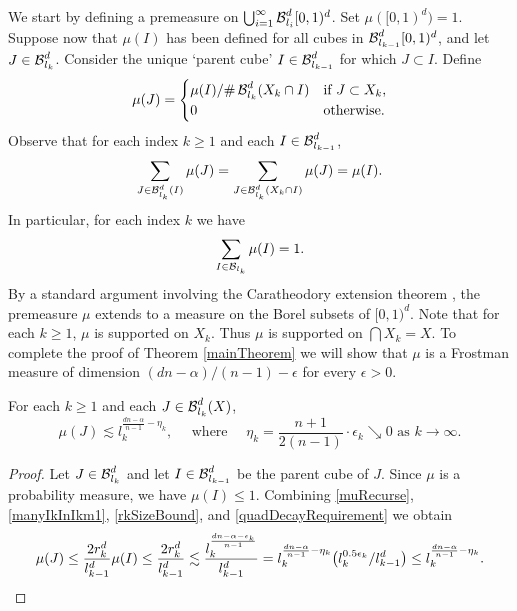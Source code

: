 We start by defining a premeasure on $\bigcup_{i = 1}^\infty \operatorname{\mathcal{B}}^d_{l_i}[0,1)^d$. Set $\mu([0,1)^d) = 1$. Suppose now that $\mu(I)$ has been defined for all cubes in $\operatorname{\mathcal{B}}^d_{l_{k-1}}[0,1)^d$, and let $J \in \operatorname{\mathcal{B}}^d_{l_k}$. Consider the unique `parent cube' $I \in \operatorname{\mathcal{B}}^d_{l_{k-1}}$ for which $J \subset I$. Define
%
\begin{equation} \label{muRecurse} 
	\mu(J) = \begin{cases} {\mu(I)}/{\# \operatorname{\mathcal{B}}^d_{l_k}(X_k \cap I)} & \textrm{if}\ J \subset X_k,\\
0 & \textrm{otherwise}.
\end{cases}
\end{equation}
Observe that for each index $k\geq 1$ and each $I \in \operatorname{\mathcal{B}}_{l_{k-1}}^d$, 
%
\begin{equation}\label{muBreakDown}
	\sum_{J \in \operatorname{\mathcal{B}}_{l_k}^d(I)} \mu(J) = \sum_{J \in \operatorname{\mathcal{B}}_{l_k}^d(X_k\cap I)} \mu(J) = \mu(I).
\end{equation}
In particular, for each index $k$ we have
%
\[ \sum_{I\in\operatorname{\mathcal{B}}_{l_k}}\mu(I)=1. \]
%
By a standard argument involving the Caratheodory extension theorem \cite[Proposition 1.7]{Falconer}, the premeasure $\mu$ extends to a measure on the Borel subsets of $[0,1)^d$. Note that for each $k \geq 1$, $\mu$ is supported on $X_k$. Thus $\mu$ is supported on $\bigcap X_k = X$. To complete the proof of Theorem \ref{mainTheorem} we will show that $\mu$ is a Frostman measure of dimension $(dn - \alpha)/(n - 1)-\epsilon$ for every $\epsilon>0$. 



\begin{lemma}\label{massSomeScales}
	For each $k\geq 1$ and each $J \in \operatorname{\mathcal{B}}^d_{l_k}(X)$, 
	\[ \mu(J) \lesssim l_k^{\frac{dn-\alpha}{n-1}- \eta_k}, \quad \text{ where } \quad \eta_k = \frac{n+1}{2(n-1)} \cdot \epsilon_k \searrow 0 \text{ as } k \rightarrow \infty. \]
\end{lemma}
\begin{proof}
	Let $J \in \operatorname{\mathcal{B}}^d_{l_k}$ and let $I \in \operatorname{\mathcal{B}}^d_{l_{k-1}}$ be the parent cube of $J$. Since $\mu$ is a probability measure, we have $\mu(I) \leq 1$. Combining \eqref{muRecurse}, \eqref{manyIkInIkm1}, \eqref{rkSizeBound}, and \eqref{quadDecayRequirement} we obtain
	\[ \mu(J)\leq \frac{2r_k^d}{l_{k-1}^d}\mu(I)\leq \frac{2r_k^d}{l_{k-1}^d}\lesssim \frac{l_{k}^{\frac{dn-\alpha - \epsilon_k}{n-1}}}{l_{k-1}^d}=l_k^{\frac{dn-\alpha}{n-1}-\eta_k}\big(l_k^{0.5 \epsilon_k}/l_{k-1}^d\big)\leq l_k^{\frac{dn-\alpha}{n-1}-\eta_k}.\qedhere \]
\end{proof}

